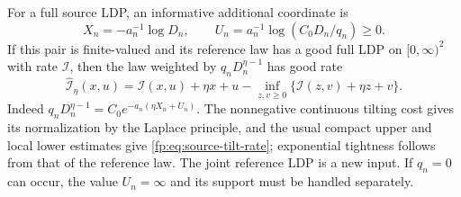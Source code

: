 For a full source LDP, an informative additional coordinate is
\[
 X_n=-a_n^{-1}\log D_n,\qquad
 U_n=a_n^{-1}\log(C_0D_n/q_n)\ge0.
\]
If this pair is finite-valued and its reference law has a good full LDP on $[0,\infty)^2$ with rate $\mathcal I$, then the law weighted by $q_nD_n^{\eta-1}$ has good rate
\begin{equation}\label{fp:eq:source-tilt-rate}
 \widehat{\mathcal I}_\eta(x,u)
 =\mathcal I(x,u)+\eta x+u
 -\inf_{z,v\ge0}\{\mathcal I(z,v)+\eta z+v\}.
\end{equation}
Indeed $q_nD_n^{\eta-1}=C_0e^{-a_n(\eta X_n+U_n)}$. The nonnegative continuous tilting cost gives its normalization by the Laplace principle, and the usual compact upper and local lower estimates give \eqref{fp:eq:source-tilt-rate}; exponential tightness follows from that of the reference law. The joint reference LDP is a new input. If $q_n=0$ can occur, the value $U_n=\infty$ and its support must be handled separately.
